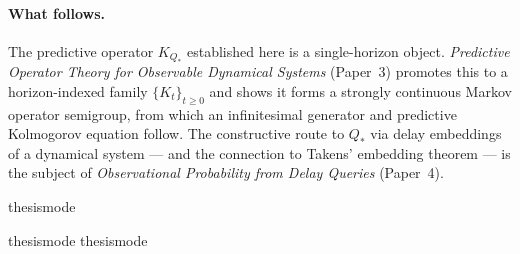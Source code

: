 \paragraph{What follows.}
The predictive operator $K_{Q_*}$ established here is a single-horizon
object.  \emph{Predictive Operator Theory for Observable Dynamical
Systems} (Paper~3) promotes this to a horizon-indexed family
$\{K_t\}_{t\ge0}$ and shows it forms a strongly continuous Markov
operator semigroup, from which an infinitesimal generator and predictive
Kolmogorov equation follow.  The constructive route to $Q_*$ via delay
embeddings of a dynamical system --- and the connection to Takens'
embedding theorem --- is the subject of \emph{Observational Probability
from Delay Queries} (Paper~4).

\ifcsname thesismode\endcsname\else


\fi

\ifcsname thesismode\endcsname\else
\ifcsname thesismode\endcsname\else\fi
\fi
